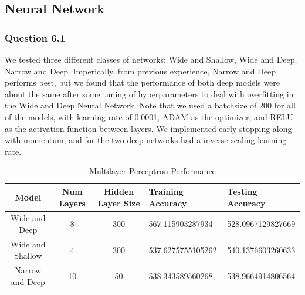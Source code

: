 \documentclass[11pt,letterpaper]{article}
\begin{document}
\subsection*{Neural Network}
\subsubsection*{Question 6.1}
We tested three different classes of networks: Wide and Shallow, Wide and Deep, 
Narrow and Deep. Imperically, from previous experience, Narrow and Deep performs 
best, but we found that the performance of both deep models were about the same after some 
tuning of hyperparameters to deal with overfitting in the Wide and Deep Neural 
Network. Note that we used a batchsize of 200 for all of the models, with 
learning rate of 0.0001, ADAM as the optimizer, and RELU as the activation 
function between layers. We implemented early stopping along with momentum, and 
for the two deep networks had a inverse scaling learning rate. 
\begin{table}[ht]
    \centering
        \label{table1} 
        \begin{tabular}{cccll} 
        \hline
        Model & Num Layers & Hidden Layer Size & Training Accuracy & Testing Accuracy \\
        \hline 
        Wide and Deep & 8 & 300 &567.115903287934 &528.0967129827669\\
        Wide and Shallow & 4 & 300 & 537.6275755105262 & 540.1376603260633 \\
        Narrow and Deep & 10 & 50 & 538.343589560268, & 538.9664914806564
        \end{tabular}
        \caption{Multilayer Perceptron Performance}
        \end{table}
\end{document}
